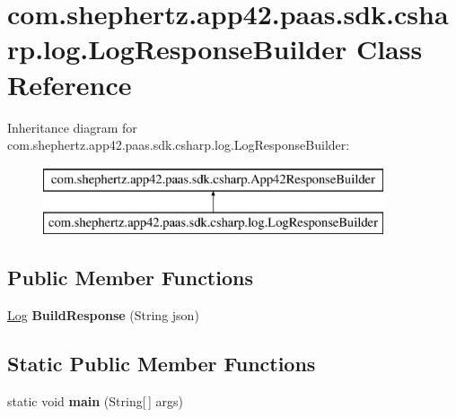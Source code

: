 \hypertarget{classcom_1_1shephertz_1_1app42_1_1paas_1_1sdk_1_1csharp_1_1log_1_1_log_response_builder}{\section{com.\+shephertz.\+app42.\+paas.\+sdk.\+csharp.\+log.\+Log\+Response\+Builder Class Reference}
\label{classcom_1_1shephertz_1_1app42_1_1paas_1_1sdk_1_1csharp_1_1log_1_1_log_response_builder}
}
Inheritance diagram for com.\+shephertz.\+app42.\+paas.\+sdk.\+csharp.\+log.\+Log\+Response\+Builder\+:\begin{figure}[H]
\begin{center}
\leavevmode
\includegraphics[height=2.000000cm]{classcom_1_1shephertz_1_1app42_1_1paas_1_1sdk_1_1csharp_1_1log_1_1_log_response_builder}
\end{center}
\end{figure}
\subsection*{Public Member Functions}
\begin{DoxyCompactItemize}
\item 
\hypertarget{classcom_1_1shephertz_1_1app42_1_1paas_1_1sdk_1_1csharp_1_1log_1_1_log_response_builder_a6afc448dd63a8e22c04d781f7d1e0fb7}{\hyperlink{classcom_1_1shephertz_1_1app42_1_1paas_1_1sdk_1_1csharp_1_1log_1_1_log}{Log} {\bfseries Build\+Response} (String json)}\label{classcom_1_1shephertz_1_1app42_1_1paas_1_1sdk_1_1csharp_1_1log_1_1_log_response_builder_a6afc448dd63a8e22c04d781f7d1e0fb7}

\end{DoxyCompactItemize}
\subsection*{Static Public Member Functions}
\begin{DoxyCompactItemize}
\item 
\hypertarget{classcom_1_1shephertz_1_1app42_1_1paas_1_1sdk_1_1csharp_1_1log_1_1_log_response_builder_aa6bc4e45fdd48b8439298ac4fbdebe28}{static void {\bfseries main} (String\mbox{[}$\,$\mbox{]} args)}\label{classcom_1_1shephertz_1_1app42_1_1paas_1_1sdk_1_1csharp_1_1log_1_1_log_response_builder_aa6bc4e45fdd48b8439298ac4fbdebe28}

\end{DoxyCompactItemize}
